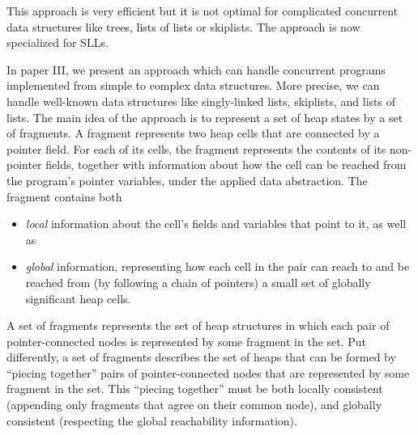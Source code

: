 
This approach is very efficient but it is not optimal for complicated concurrent data structures like trees, lists of lists or skiplists. The  approach is now specialized for SLLs. 

In paper III, we present an approach which can handle concurrent programs implemented from simple to complex data structures. More precise, we can handle well-known data structures like singly-linked lists, skiplists, and lists of lists. 
The main idea of the approach is to represent a set of heap states by a set
of fragments. A fragment represents two heap cells that are connected by a pointer
field. For each of its cells, the fragment represents the contents of its non-pointer fields,
together with information about how the cell can be reached from the program’s pointer
variables, under the applied data abstraction. The fragment contains both
\begin{itemize}
\item {\em local} information about the cell's fields and variables that
  point to it, as well as
\item {\em global} information, representing how
  each cell in the pair can reach to and be reached from
  (by following a chain of pointers) a small set of globally significant
  heap cells.
\end{itemize}
 A set of fragments represents the set of heap
structures in which each pair of pointer-connected nodes is represented by some
fragment in the set.
Put differently, a set of fragments describes the set of heaps that can be formed by
``piecing together'' pairs of pointer-connected nodes that are represented
by some fragment in the set. This ``piecing together'' must
be both locally consistent (appending only fragments that agree on their
common node), and globally consistent (respecting the global reachability
information).
%

